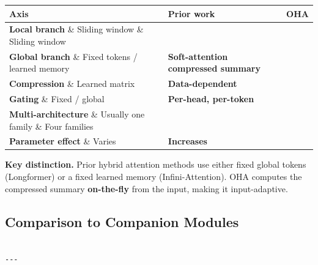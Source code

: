 \begin{table}[H]
\centering
\small
\begin{tabular}{lll}
\toprule
\textbf{Axis} & \textbf{Prior work} & \textbf{OHA} \\
\midrule
\textbf{Local branch} \& Sliding window \& Sliding window \\
\textbf{Global branch} \& Fixed tokens / learned memory & \textbf{Soft-attention compressed summary} \\
\textbf{Compression} \& Learned matrix & \textbf{Data-dependent} \\
\textbf{Gating} \& Fixed / global & \textbf{Per-head, per-token} \\
\textbf{Multi-architecture} \& Usually one family \& Four families \\
\textbf{Parameter effect} \& Varies & \textbf{Increases} \\
\bottomrule
\end{tabular}
\end{table}

\textbf{Key distinction.} Prior hybrid attention methods use either fixed global 
tokens (Longformer) or a fixed learned memory (Infini-Attention). OHA 
computes the compressed summary \textbf{on-the-fly} from the input, making it 
input-adaptive.

\subsection{Comparison to Companion Modules}

\begin{lstlisting}

---
\end{lstlisting}